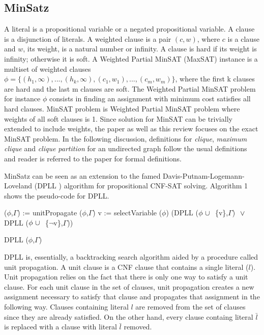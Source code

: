 \subsection{MinSatz}
A literal is a propositional variable or a negated propositional variable. A
clause is a disjunction of literals. A weighted clause is a pair $(c, w)$, where
$c$ is a clause and $w$, its weight, is a natural number or infinity. A clause is
hard if its weight is infinity; otherwise it is soft. A Weighted Partial MinSAT
(MaxSAT) instance is a multiset of weighted clauses $\phi =
\{(h_1,\infty),...,(h_k,\infty),(c_1, w_1),...,(c_m, w_m)\}$, where the ﬁrst k
clauses are hard and the last m clauses are soft. The Weighted Partial MinSAT
problem for instance $\phi$ consists in finding an assignment with minimum cost
satisfies all hard clauses. MinSAT problem is Weighted Partial MinSAT problem
where weights of all soft clauses is 1. Since solution for MinSAT can be
trivially extended to include weights, the paper as well as this review focuses
on the exact MinSAT problem. In the following discussion, definitions for
\emph{clique}, \emph{maximum clique} and \emph{clique partition} for an
undirected graph follow the usual definitions and reader is referred to the
paper for formal definitions.

MinSatz can be seen as an extension to the famed Davis-Putnam-Logemann-Loveland
(DPLL \cite{dpll}) algorithm for propositional CNF-SAT solving. Algorithm 1
shows the pseudo-code for DPLL. 
\begin{algorithm}
 \SetAlgoLined 
 ($\phi$,$\Gamma$) := unitPropagate ($\phi$,$\Gamma$)\;
  v := selectVariable ($\phi$)\;
  \Return (DPLL ($\phi ~\cup~ $ \{v\},$\Gamma$) $~\vee~$ 
          DPLL ($\phi ~\cup~ $ \{$\neg$v\},$\Gamma$))
 \caption{DPLL ($\phi$,$\Gamma$)}
\end{algorithm}
DPLL is, essentially, a backtracking search algorithm aided by a procedure
called unit propagation. A unit clause is a CNF clause that contains a single
literal ($l$). Unit propagation relies on the fact that there is only one way to
satisfy a unit clause. For each unit clause in the set of clauses, unit
propagation creates a new assignment necessary to satisfy that clause and
propagates that assignment in the following way. Clauses containing literal $l$
are removed from the set of clauses since they are already satisfied. On the
other hand, every clause containg literal $\bar{l}$ is replaced with a clause
with literal $\bar{l}$ removed. 

